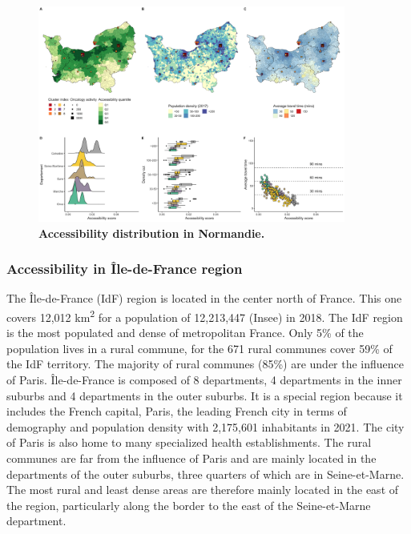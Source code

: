 \begin{figure}[h!]
    \includegraphics[width=0.9\textwidth]{images/camion/region_accessibility/accessibility_Normandie.png}
    \centering
    \caption{
        \textbf{Accessibility distribution in Normandie.}
    }
\end{figure}

\subsubsection{Accessibility in Île-de-France region}

The Île-de-France (IdF) region is located in the center north of France. This
one covers 12,012 km\textsuperscript{2} for a population of 12,213,447 (Insee)
in 2018. The IdF region is the most populated and dense of metropolitan France.
Only 5\% of the population lives in a rural commune, for the 671 rural communes
cover 59\% of the IdF territory. The majority of rural communes (85\%) are under
the influence of Paris. Île-de-France is composed of 8 departments, 4
departments in the inner suburbs and 4 departments in the outer suburbs. It is a
special region because it includes the French capital, Paris, the leading French
city in terms of demography and population density with 2,175,601 inhabitants in
2021. The city of Paris is also home to many specialized health establishments.
The rural communes are far from the influence of Paris and are mainly located in
the departments of the outer suburbs, three quarters of which are in
Seine-et-Marne. The most rural and least dense areas are therefore mainly
located in the east of the region, particularly along the border to the east of
the Seine-et-Marne department.

